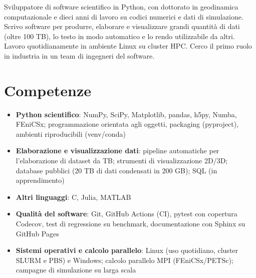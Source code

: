 \documentclass[11pt,a4paper,sans]{moderncv}
\begin{document}
\makecvtitle


\vspace{6pt}
\small{Sviluppatore di software scientifico in Python, con dottorato in geodinamica computazionale e dieci anni di lavoro su codici numerici e dati di simulazione. Scrivo software per produrre, elaborare e visualizzare grandi quantità di dati (oltre 100 TB), lo testo in modo automatico e lo rendo utilizzabile da altri. Lavoro quotidianamente in ambiente Linux su cluster HPC. Cerco il primo ruolo in industria in un team di ingegneri del software.}


\section{Competenze}
\vspace{1pt}
\begin{itemize}

\item \textbf{Python scientifico}: NumPy, SciPy, Matplotlib, pandas, h5py, Numba, FEniCSx; programmazione orientata agli oggetti, packaging (pyproject), ambienti riproducibili (venv/conda)

\item \textbf{Elaborazione e visualizzazione dati}: pipeline automatiche per l'elaborazione di dataset da TB; strumenti di visualizzazione 2D/3D; database pubblici (20 TB di dati condensati in 200 GB); SQL (in apprendimento)

\item \textbf{Altri linguaggi}: C, Julia, MATLAB

\item \textbf{Qualità del software}: Git, GitHub Actions (CI), pytest con copertura Codecov, test di regressione su benchmark, documentazione con Sphinx su GitHub Pages

\item \textbf{Sistemi operativi e calcolo parallelo}: Linux (uso quotidiano, cluster SLURM e PBS) e Windows; calcolo parallelo MPI (FEniCSx/PETSc); campagne di simulazione su larga scala

\end{itemize}
\end{document}
